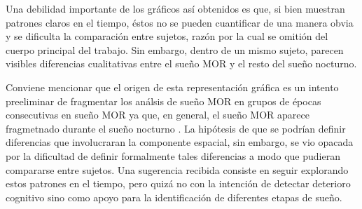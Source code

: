Una debilidad importante de los gr\'aficos as\'i obtenidos es que, si bien muestran patrones 
claros en el tiempo, \'estos no se pueden cuantificar de una manera obvia y se dificulta la
comparaci\'on entre sujetos, raz\'on por la cual se omiti\'on del cuerpo principal del trabajo. 
Sin embargo, dentro de un mismo sujeto, parecen visibles diferencias cualitativas
entre el sue\~no MOR y el resto del sue\~no nocturno.

Conviene mencionar que el origen de esta representaci\'on gr\'afica es un intento preeliminar de
fragmentar los an\'alsis de sue\~no MOR en grupos de \'epocas consecutivas en sue\~no MOR ya que,
en general, el sue\~no MOR aparece fragmetnado durante el sue\~no nocturno \cite{CarrilloMora}.
La hip\'otesis de que se podr\'ian definir diferencias que involucraran la componente espacial,
sin embargo, se vio opacada por la dificultad de definir formalmente tales diferencias a modo
que pudieran compararse entre sujetos.
Una sugerencia recibida consiste en seguir explorando estos patrones en el tiempo, pero quiz\'a
no con la intenci\'on de detectar deterioro cognitivo sino como apoyo para la identificaci\'on de
diferentes etapas de sue\~no.



%
%

